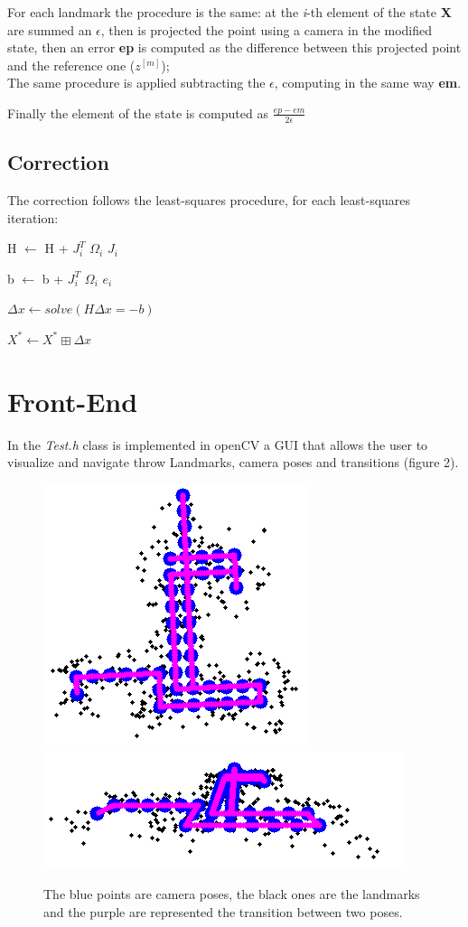 \documentclass[10pt]{article}
\begin{document}
	For each landmark the procedure is the same: at the \textit{i}-th element of the state \textbf{X} are summed an $\epsilon$, then is projected the point using a camera in the modified state, then an error \textbf{ep} is computed as the difference between this projected point and the reference one ($z^{[\textit{m}]}$);\\
	The same procedure is applied subtracting the $\epsilon$, computing in the same way \textbf{em}.
	
	Finally the element of the state is computed as $\frac{ep - em}{2\epsilon}$
	
	\subsection{Correction}
	The correction follows the least-squares procedure, for each least-squares iteration:
	\begin{center}
		H $\leftarrow$ H + $J_{\textit{i}}^{T}$ $\Omega_{\textit{i}}$ $J_{\textit{i}}$		
	
		b $\leftarrow$ b + $J_{\textit{i}}^{T}$ $\Omega_{\textit{i}}$ $e_{\textit{i}}$ 
	
		$\Delta x \leftarrow solve(H\Delta x=-b)$
	
		$X^* \leftarrow X^* \boxplus \Delta x$
	\end{center}
	
	\section{Front-End}
	In the \textit{Test.h} class is implemented in openCV a GUI that allows the user to visualize and navigate throw Landmarks, camera poses and transitions (figure 2). 
	
	\begin{figure}[H]
		\centering
		\includegraphics[width=0.5\linewidth]{img/exact}
		\includegraphics[width=0.8\linewidth]{img/exact2}
		\caption{The blue points are camera poses, the black ones are the landmarks and the purple are represented the transition between two poses.}
		\label{fig:exact}
	\end{figure}
	
\end{document}
